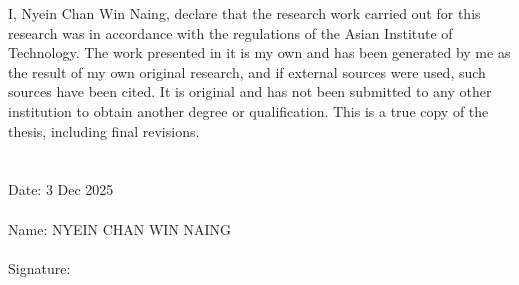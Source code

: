 \begin{center}
    \fontsize{14}{17}
\end{center}

\setlength{\parindent}{0pt}
\setlength{\parskip}{1em}
\setlength{\baselineskip}{1.6em}


\vspace{3em}

I, Nyein Chan Win Naing, declare that the research work carried out for this research was in accordance with the regulations of the Asian Institute of Technology. The work presented in it is my own and has been generated by me as the result of my own original research, and if external sources were used, such sources have been cited. It is original and has not been submitted to any other institution to obtain another degree or qualification. This is a true copy of the thesis, including final revisions.
\\
\\
\\
Date: 3 Dec 2025
\\
\\
Name: NYEIN CHAN WIN NAING
\\
\\
Signature:

